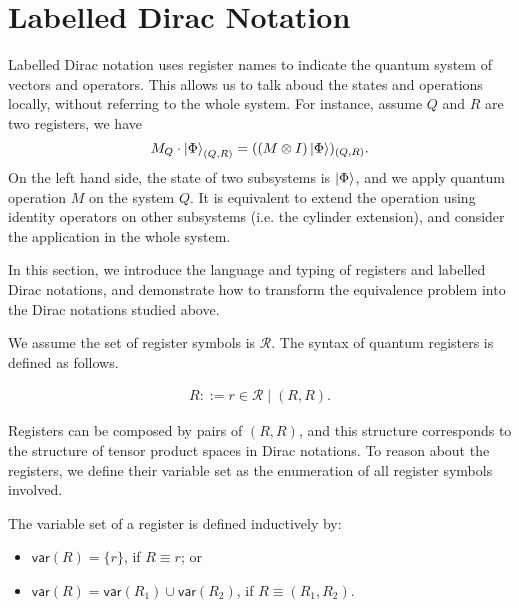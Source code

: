 


\newcommand{\var}{\mathsf{var}}
\newcommand{\reg}{\mathsf{Reg}}
\newcommand{\DType}{\mathcal{D}}
\newcommand{\cR}{\mathcal{R}}
\newcommand{\cN}{\mathcal{N}}
\newcommand{\tD}{\tilde{D}}
\newcommand{\te}{\tilde{e}}
\newcommand{\tT}{\tilde{T}}
\newcommand{\tADD}{\widetilde{ADD}}
\newcommand{\bU}{\mathbf{U}}
\newcommand{\<}{\langle}
\newcommand{\simp}{\mathsf{Simp}}
\newcommand{\List}{\mathsf{list}}
\renewcommand{\>}{\rangle}


\section{Labelled Dirac Notation}

Labelled Dirac notation uses register names to indicate the quantum system of vectors and operators. This allows us to talk aboud the states and operations locally, without referring to the whole system. For instance, assume $Q$ and $R$ are two registers, we have
\[
    M_Q \cdot \ket{\Phi}_{(Q, R)} = ((M \otimes I) \ket{\Phi})_{(Q, R)}.
\]
On the left hand side, the state of two subsystems is $\ket{\Phi}$, and we apply quantum operation $M$ on the system $Q$. It is equivalent to extend the operation using identity operators on other subsystems (i.e. the cylinder extension), and consider the application in the whole system.


In this section, we introduce the language and typing of registers and labelled Dirac notations, and demonstrate how to transform the equivalence problem into the Dirac notations studied above.

We assume the set of register symbols is $\cR$. The syntax of quantum registers is defined as follows.
\begin{definition}
  \begin{align*}
    R ::= r\in\cR \mid (R, R).
  \end{align*}
\end{definition}

Registers can be composed by pairs of $(R, R)$, and this structure corresponds to the structure of tensor product spaces in Dirac notations.
To reason about the registers, we define their variable set as the enumeration of all register symbols involved.

\begin{definition}
The variable set of a register is defined inductively by:
\begin{itemize}
    \item $\var(R) = \{r\}$, if $R\equiv r$; or
    \item $\var(R) = \var(R_1) \cup\var(R_2)$, if $R\equiv (R_1,R_2)$.
\end{itemize}
\end{definition}

